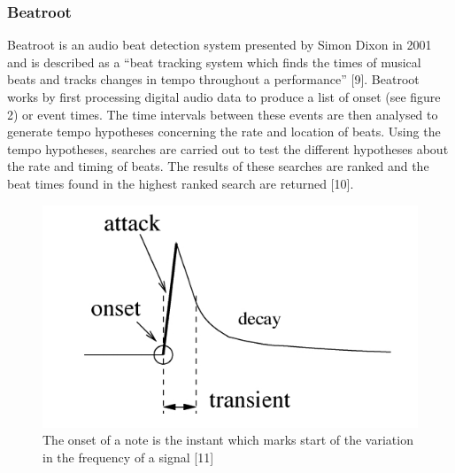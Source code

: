 \documentclass[a4paper, 11pt]{article}
\begin{document}
\subsubsection{Beatroot}
Beatroot is an audio beat detection system presented by Simon Dixon in 2001 and is described as a ``beat tracking system which finds the times of musical beats and tracks changes in tempo throughout a performance'' [9]. Beatroot works by first processing digital audio data to produce a list of onset (see figure 2) or event times. The time intervals between these events are then analysed to generate tempo hypotheses concerning the rate and location of beats. Using the tempo hypotheses, searches are carried out to test the different hypotheses about the rate and timing of beats. The results of these searches are ranked and the beat times found in the highest ranked search are returned [10]. 


\begin{figure}[h]
	\centering
	\includegraphics[scale=0.40]{Onset}
	\caption{The onset of a note is the instant which marks start of the variation in the frequency of a signal [11]}
\end{figure}
\end{document}
